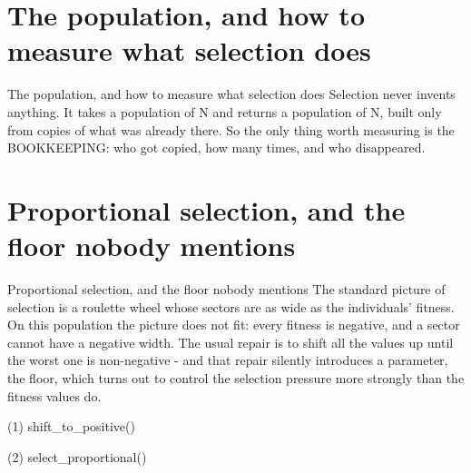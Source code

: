 \section{The population, and how to measure what selection does}

\begin{frame}{The population, and how to measure what selection does}
Selection never invents anything. It takes a population of N and returns a
population of N, built only from copies of what was already there. So the only
thing worth measuring is the BOOKKEEPING: who got copied, how many times, and
who disappeared.
\end{frame}


\section{Proportional selection, and the floor nobody mentions}

\begin{frame}{Proportional selection, and the floor nobody mentions}
The standard picture of selection is a roulette wheel whose sectors are as wide
as the individuals' fitness. On this population the picture does not fit: every
fitness is negative, and a sector cannot have a negative width. The usual
repair is to shift all the values up until the worst one is non-negative - and
that repair silently introduces a parameter, the floor, which turns out to
control the selection pressure more strongly than the fitness values do.
\end{frame}

\begin{frame}[fragile]{(1) shift\_to\_positive()}

\end{frame}

\begin{frame}[fragile]{(2) select\_proportional()}

\end{frame}

